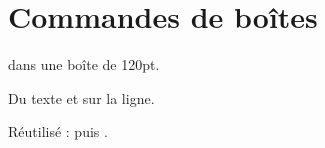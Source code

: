 \documentclass{article}
\begin{document}
\hsize=380pt
\section{Commandes de bo\^ites}
 dans une bo\^ite de 120pt.\par
Du texte  et  sur la ligne.\par
\newsavebox{\ma}%
R\'eutilis\'e : \usebox{\ma} puis \usebox{\ma}.
\end{document}
